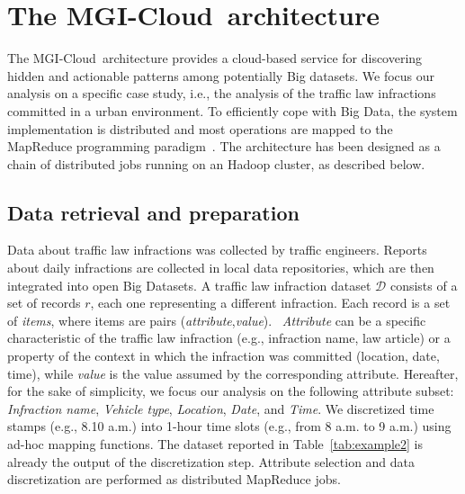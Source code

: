 \documentclass[10pt, conference, compsocconf]{IEEEtran}
\newcommand{\SeTAB}{{\sc MGI-Cloud}}
\begin{document}
\section{The \SeTAB\ architecture}
\label{setarch}

The \SeTAB\ architecture provides a cloud-based service for discovering hidden and actionable patterns among potentially Big datasets.
We focus our analysis on a specific case study, i.e., the analysis of the traffic law infractions committed in a urban environment. 
To efficiently cope with Big Data, the system implementation is distributed and most operations are mapped to the MapReduce programming paradigm~\cite{Dean2008}.
The architecture has been designed as a chain of distributed jobs running on an Hadoop cluster, as described below. 


\subsection{Data retrieval and preparation}
\label{acquisitionprep}

Data about traffic law infractions was collected by traffic engineers. 
Reports about daily infractions are collected in local data repositories, which are then integrated into open Big Datasets. 
A traffic law infraction dataset $\mathcal{D}$ consists of a set of records $r$, each one representing a different infraction. 
Each record is a set of \textit{items}, where items are pairs (\textit{attribute},\textit{value}). \
\textit{Attribute} can be a specific characteristic of the traffic law infraction (e.g.,  infraction name, law article) 
or a property of the context in which the infraction was committed (location, date, time), 
while \textit{value} is the value assumed by the corresponding attribute. 
Hereafter, for the sake of simplicity, we focus our analysis on the following attribute subset: \textit{Infraction name}, \textit{Vehicle type}, \textit{Location}, \textit{Date}, and \textit{Time}. 
We discretized time stamps (e.g., 8.10 a.m.) into 1-hour time slots (e.g., from 8 a.m. to 9 a.m.) using ad-hoc mapping functions. 
The dataset reported in Table~\ref{tab:example2} is already the output of the discretization step.
Attribute selection and data discretization are performed as distributed MapReduce jobs.
\end{document}
